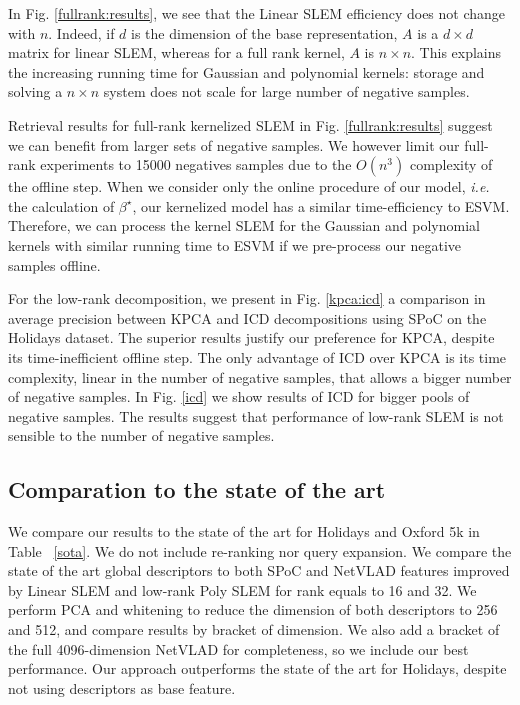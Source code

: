 In Fig. \ref{fullrank:results}, we see that the Linear SLEM efficiency does not change with $n$.
Indeed, if $d$ is the dimension of the base representation, $A$ is a $d\times d$ matrix for linear SLEM, whereas for a full rank kernel, $A$ is $n\times n$.
This explains the increasing running time for Gaussian and polynomial kernels: storage and solving a $n\times n$ system does not scale for large number of negative samples.

Retrieval results for full-rank kernelized SLEM in Fig. \ref{fullrank:results} suggest we can benefit from larger sets of negative samples. We however limit our full-rank experiments to 15000 negatives samples due to the $O(n^3)$ complexity of the offline step.
When we consider only the online procedure of our model, \emph{i.e.} the calculation of $\beta^\star$, our kernelized model has a similar time-efficiency to ESVM. Therefore, we can process the kernel SLEM for the Gaussian and polynomial kernels with similar running time to ESVM if we pre-process our negative samples offline.

For the low-rank decomposition, we present in Fig. \ref{kpca:icd} a comparison in average precision between KPCA and ICD decompositions using SPoC on the Holidays dataset. The superior results justify our preference for KPCA, despite its time-inefficient offline step. The only advantage of ICD over KPCA is its time complexity, linear in the number of negative samples, that allows a bigger number of negative samples. In Fig. \ref{icd} we show results of ICD for bigger pools of negative samples. The results suggest that performance of low-rank SLEM is not sensible to the number of negative samples.




\vspace{3 mm}



\subsection{Comparation to the state of the art}
We compare our results to the state of the art for Holidays and Oxford 5k in Table ~\ref{sota}.  We do not include re-ranking nor query expansion. We compare the state of the art global descriptors to both SPoC and NetVLAD features improved by Linear SLEM and low-rank Poly SLEM for rank equals to 16 and 32. We perform PCA and whitening to reduce the dimension of both descriptors to 256 and 512, and compare results by bracket of dimension. We also add a bracket of the full 4096-dimension NetVLAD for completeness, so we include our best performance. Our approach outperforms the state of the art for Holidays, despite not using descriptors as base feature. 

